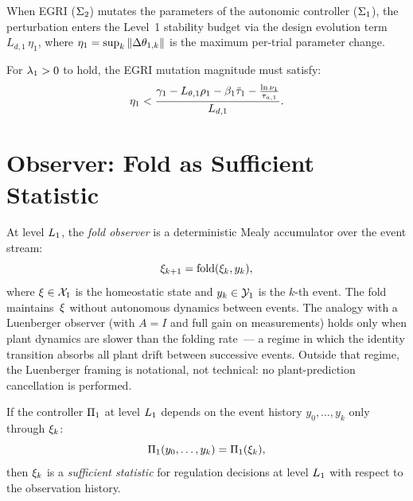 \documentclass[11pt,a4paper]{article}
\begin{document}
\begin{proposition}
\label{prop:egri-coupling}
When EGRI ($\Sigma_2$) mutates the parameters of the autonomic controller
($\Sigma_1$), the perturbation enters the Level~1 stability budget
via the design evolution term $L_{d,1} \, \eta_1$, where
$\eta_1 = \sup_k \left\| \Delta \theta_{1,k} \right\|$ is the maximum per-trial
parameter change.

For $\lambda_1 > 0$ to hold, the EGRI mutation magnitude must satisfy:
\begin{equation}
  \eta_1 < \frac{\decay_1 - L_{\param,1}\rho_1 - \beta_1\taubar_1
  - \frac{\ln\nu_1}{\taua[1]}}{L_{d,1}}.
\end{equation}
\end{proposition}


\section{Observer: Fold as Sufficient Statistic}
\label{sec:observer}

\begin{definition}
\label{def:fold}
At level $L_{1}$, the \emph{fold observer} is a deterministic Mealy
accumulator over the event stream:
\begin{equation}
  \xi_{k+1} = \text{fold}(\xi_k, y_k),
\end{equation}
where $\xi \in \mathcal{X}_1$ is the homeostatic state and $y_k \in \mathcal{Y}_1$
is the $k$-th event.  The fold maintains~$\xi$ without
autonomous dynamics between events.  The analogy with a Luenberger
observer (with $A = I$ and full gain on measurements) holds only when
plant dynamics are slower than the folding rate~--- a regime in which
the identity transition absorbs all plant drift between successive
events.  Outside that regime, the Luenberger framing is notational, not
technical: no plant-prediction cancellation is performed.
\end{definition}

\begin{proposition}[Sufficiency]
\label{prop:sufficient}
If the controller $\Pi_1$ at level $L_{1}$ depends on the event history
$y_0, \ldots, y_k$ only through $\xi_k$:
\begin{equation}
  \Pi_1(y_0, \ldots, y_k) = \Pi_1(\xi_k),
\end{equation}
then $\xi_k$ is a \emph{sufficient statistic} for regulation decisions
at level $L_{1}$ with respect to the observation history.
\end{proposition}
\end{document}
